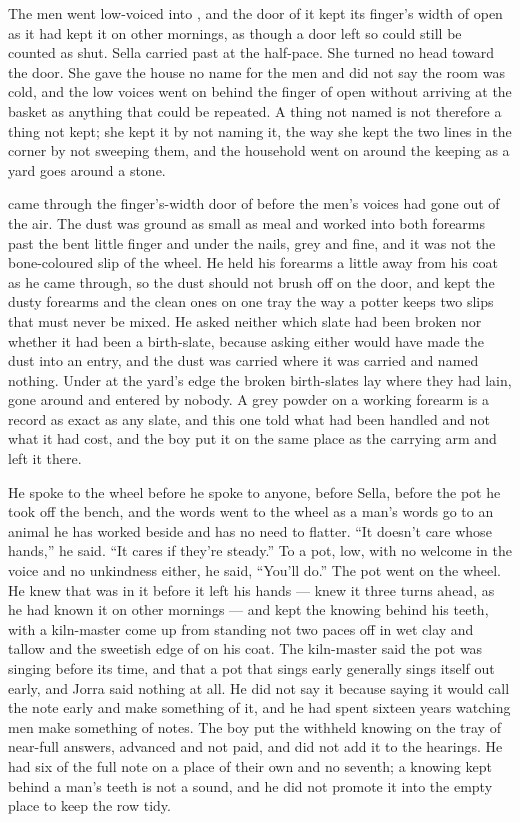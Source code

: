 The men went low-voiced into , and the door of it kept its finger's width of open as it had kept it on other mornings, as though a door left so could still be counted as shut. Sella carried past at the half-pace. She turned no head toward the door. She gave the house no name for the men and did not say the room was cold, and the low voices went on behind the finger of open without arriving at the basket as anything that could be repeated. A thing not named is not therefore a thing not kept; she kept it by not naming it, the way she kept the two lines in the corner by not sweeping them, and the household went on around the keeping as a yard goes around a stone.

 came through the finger's-width door of  before the men's voices had gone out of the air. The dust was ground as small as meal and worked into both forearms past the bent little finger and under the nails, grey and fine, and it was not the bone-coloured slip of the wheel. He held his forearms a little away from his coat as he came through, so the dust should not brush off on the door, and kept the dusty forearms and the clean ones on one tray the way a potter keeps two slips that must never be mixed. He asked neither which slate had been broken nor whether it had been a birth-slate, because asking either would have made the dust into an entry, and the dust was carried where it was carried and named nothing. Under  at the yard's edge the broken birth-slates lay where they had lain, gone around and entered by nobody. A grey powder on a working forearm is a record as exact as any slate, and this one told what had been handled and not what it had cost, and the boy put it on the same place as the carrying arm and left it there.

He spoke to the wheel before he spoke to anyone, before Sella, before the pot he took off the bench, and the words went to the wheel as a man's words go to an animal he has worked beside and has no need to flatter. “It doesn't care whose hands,” he said. “It cares if they're steady.” To a pot, low, with no welcome in the voice and no unkindness either, he said, “You'll do.” The pot went on the wheel. He knew  that was in it before it left his hands --- knew it three turns ahead, as he had known it on other mornings --- and kept the knowing behind his teeth, with a kiln-master come up from  standing not two paces off in wet clay and tallow and the sweetish edge of  on his coat. The kiln-master said the pot was singing before its time, and that a pot that sings early generally sings itself out early, and Jorra said nothing at all. He did not say it because saying it would call the note early and make something of it, and he had spent sixteen years watching men make something of notes. The boy put the withheld knowing on the tray of near-full answers, advanced and not paid, and did not add it to the hearings. He had six of the full note on a place of their own and no seventh; a knowing kept behind a man's teeth is not a sound, and he did not promote it into the empty place to keep the row tidy.

